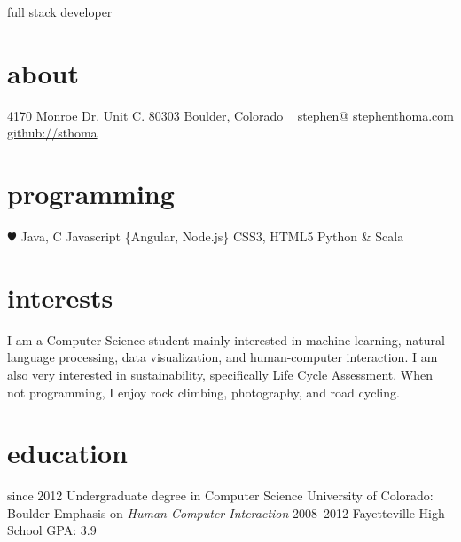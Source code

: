 \documentclass[]{thoma-cv}
\begin{document}
       {full stack developer}


\begin{aside}
  \section{about}
    4170 Monroe Dr.
    Unit C. 80303
    Boulder, Colorado
    ~
    \href{mailto:stephen@stephenthoma.com}{stephen@}
    \href{http://stephenthoma.com}{stephenthoma.com}
    \href{https://github.com/sthoma}{github://sthoma}
  \section{programming}
    {\color{red} $\varheartsuit$} Java, C
    Javascript
    {\fontsize{8}{9.6} \selectfont \{Angular, Node.js\}}
    CSS3, HTML5
    Python \& Scala
\end{aside}

\section{interests}
I am a Computer Science student mainly interested in machine learning,
natural language processing, data visualization, and human-computer interaction.
I am also very interested in sustainability, specifically Life Cycle Assessment.
When not programming, I enjoy rock climbing, photography, and road cycling.

\section{education}

\startchronology
[startyear=2005, height=0.95pc, dates=false, color=gray]
\stopchronology

\begin{entrylist}
  \entry
    {since 2012}
    {Undergraduate degree {\normalfont in Computer Science}}
    {University of Colorado: Boulder}
    {Emphasis on \emph{Human Computer Interaction}}
  \entry
    {2008–2012}
    {Fayetteville High School}
    {}
    {GPA: 3.9}
\end{entrylist}
\end{document}
